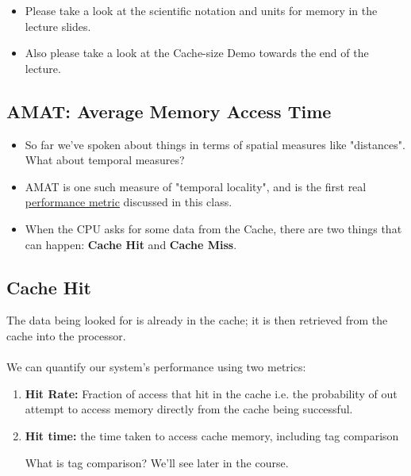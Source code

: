\documentclass[11pt]{article}
\begin{document}
\begin{redbox}
  \begin{itemize}
    \item Please take a look at the scientific notation and units for memory in the lecture slides.
    \item Also please take a look at the Cache-size Demo towards the end of the lecture.
  \end{itemize}
\end{redbox}

\vskip 1cm
\subsection{AMAT: Average Memory Access Time}
\begin{itemize}
  \item So far we've spoken about things in terms of spatial measures like "distances". What about temporal measures?
  \item AMAT is one such measure of "temporal locality", and is the first real \underline{performance metric} discussed in this class.
  \item When the CPU asks for some data from the Cache, there are two things that can happen: \textbf{Cache Hit} and \textbf{Cache Miss}.
\end{itemize}

\vskip 0.5cm
\subsection*{Cache Hit}
The data being looked for is already in the cache; it is then retrieved from the cache into the processor.
\\
\\
We can quantify our system's performance using two metrics:
\begin{enumerate}
  \item \textbf{Hit Rate:} Fraction of access that hit in the cache i.e. the probability of out attempt to access memory directly from the cache being successful.
  \item \textbf{Hit time:} the time taken to access cache memory, including tag comparison \begin{note}
  {What is tag comparison? We'll see later in the course.}
  \end{note}
\end{enumerate}
\end{document}
